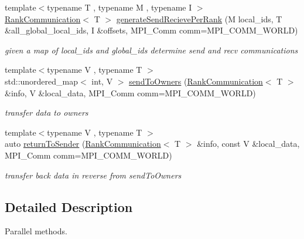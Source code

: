 \begin{DoxyCompactItemize}
\item 
{\footnotesize template$<$typename T , typename M , typename I $>$ }\\\hyperlink{structop_1_1utility_1_1RankCommunication}{Rank\-Communication}$<$ T $>$ \hyperlink{namespaceop_1_1utility_1_1parallel_ac0750ed88d7d043ce773c43f5e44845b}{generate\-Send\-Recieve\-Per\-Rank} (M local\-\_\-ids, T \&all\-\_\-global\-\_\-local\-\_\-ids, I \&offsets, M\-P\-I\-\_\-\-Comm comm=M\-P\-I\-\_\-\-C\-O\-M\-M\-\_\-\-W\-O\-R\-L\-D)
\begin{DoxyCompactList}\small\item\em given a map of local\-\_\-ids and global\-\_\-ids determine send and recv communications \end{DoxyCompactList}\item 
{\footnotesize template$<$typename V , typename T $>$ }\\std\-::unordered\-\_\-map$<$ int, V $>$ \hyperlink{namespaceop_1_1utility_1_1parallel_a76f92474437a2daa6ddb545e7840b0f8}{send\-To\-Owners} (\hyperlink{structop_1_1utility_1_1RankCommunication}{Rank\-Communication}$<$ T $>$ \&info, V \&local\-\_\-data, M\-P\-I\-\_\-\-Comm comm=M\-P\-I\-\_\-\-C\-O\-M\-M\-\_\-\-W\-O\-R\-L\-D)
\begin{DoxyCompactList}\small\item\em transfer data to owners \end{DoxyCompactList}\item 
{\footnotesize template$<$typename V , typename T $>$ }\\auto \hyperlink{namespaceop_1_1utility_1_1parallel_ada734fd9abaf6a8fff60d90a003693ec}{return\-To\-Sender} (\hyperlink{structop_1_1utility_1_1RankCommunication}{Rank\-Communication}$<$ T $>$ \&info, const V \&local\-\_\-data, M\-P\-I\-\_\-\-Comm comm=M\-P\-I\-\_\-\-C\-O\-M\-M\-\_\-\-W\-O\-R\-L\-D)
\begin{DoxyCompactList}\small\item\em transfer back data in reverse from send\-To\-Owners \end{DoxyCompactList}\end{DoxyCompactItemize}


\subsection{Detailed Description}
Parallel methods. 

